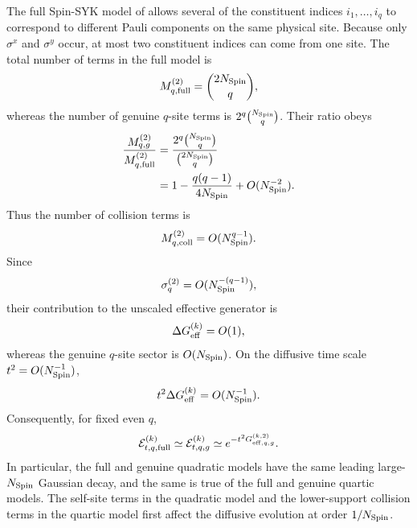 \documentclass{article}
\theoremstyle{definition}
\begin{document}
The full Spin-SYK model of \cite{BasuDasNandy} allows several of the
constituent indices $i_1,\ldots,i_q$ to correspond to different Pauli
components on the same physical site.  Because only $\sigma^x$ and
$\sigma^y$ occur, at most two constituent indices can come from one
site.  The total number of terms in the full model is
\begin{equation}
    M_{q,{\rm full}}^{(2)}
    =
    \binom{2N_{\rm Spin}}q,
    \label{eq:BDN_full_number}
\end{equation}
whereas the number of genuine $q$-site terms is
$2^q\binom{N_{\rm Spin}}q$.  Their ratio obeys
\begin{align}
    \frac{
       M_{q,g}^{(2)}
    }{
       M_{q,{\rm full}}^{(2)}
    }
    &=
    \frac{
       2^q\binom{N_{\rm Spin}}q
    }{
       \binom{2N_{\rm Spin}}q
    }
    \nonumber\\
    &=
    1-
    \frac{q(q-1)}
         {4N_{\rm Spin}}
    +
    O(N_{\rm Spin}^{-2}).
    \label{eq:BDN_genuine_fraction}
\end{align}
Thus the number of collision terms is
\begin{equation}
    M_{q,{\rm coll}}^{(2)}
    =
    O(N_{\rm Spin}^{q-1}).
    \label{eq:BDN_collision_number}
\end{equation}
Since
\begin{equation}
    \sigma_q^{(2)}
    =
    O(N_{\rm Spin}^{-(q-1)}),
\end{equation}
their contribution to the unscaled effective generator is
\begin{equation}
    \Delta G_{\rm eff}^{(k)}
    =
    O(1),
    \label{eq:BDN_collision_G}
\end{equation}
whereas the genuine $q$-site sector is $O(N_{\rm Spin})$.  On the
diffusive time scale $t^2=O(N_{\rm Spin}^{-1})$,
\begin{equation}
    t^2\Delta G_{\rm eff}^{(k)}
    =
    O(N_{\rm Spin}^{-1}).
    \label{eq:BDN_collision_suppression}
\end{equation}
Consequently, for fixed even $q$,
\begin{equation}
    {\cal E}_{t,q,{\rm full}}^{(k)}
    \simeq
    {\cal E}_{t,q,g}^{(k)}
    \simeq
    e^{-t^2G_{{\rm eff},q,g}^{(k,2)}}.
    \label{eq:BDN_full_genuine_same}
\end{equation}
In particular, the full and genuine quadratic models have the same
leading large-$N_{\rm Spin}$ Gaussian decay, and the same is true of the
full and genuine quartic models.  The self-site terms in the quadratic
model and the lower-support collision terms in the quartic model first
affect the diffusive evolution at order $1/N_{\rm Spin}$.
\end{document}

